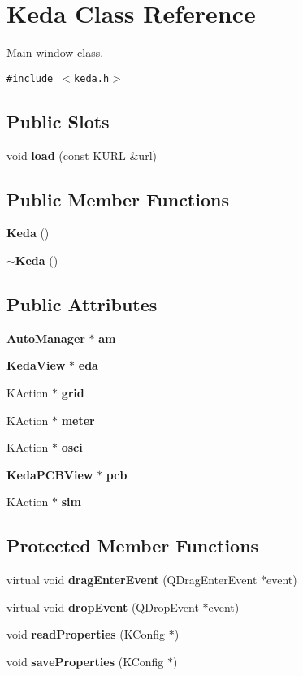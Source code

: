 \section{Keda Class Reference}
\label{classKeda}
Main window class.  


{\tt \#include $<$keda.h$>$}

\subsection*{Public Slots}
\begin{CompactItemize}
\item 
void {\bf load} (const KURL \&url)
\end{CompactItemize}
\subsection*{Public Member Functions}
\begin{CompactItemize}
\item 
{\bf Keda} ()
\item 
{\bf $\sim$Keda} ()
\end{CompactItemize}
\subsection*{Public Attributes}
\begin{CompactItemize}
\item 
{\bf Auto\-Manager} $\ast$ {\bf am}
\item 
{\bf Keda\-View} $\ast$ {\bf eda}
\item 
KAction $\ast$ {\bf grid}
\item 
KAction $\ast$ {\bf meter}
\item 
KAction $\ast$ {\bf osci}
\item 
{\bf Keda\-PCBView} $\ast$ {\bf pcb}
\item 
KAction $\ast$ {\bf sim}
\end{CompactItemize}
\subsection*{Protected Member Functions}
\begin{CompactItemize}
\item 
virtual void {\bf drag\-Enter\-Event} (QDrag\-Enter\-Event $\ast$event)
\item 
virtual void {\bf drop\-Event} (QDrop\-Event $\ast$event)
\item 
void {\bf read\-Properties} (KConfig $\ast$)
\item 
void {\bf save\-Properties} (KConfig $\ast$)
\end{CompactItemize}
